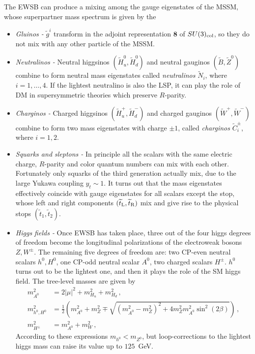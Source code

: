 \documentclass[12pt,a4paper]{book}
\newcommand{\bi}{\begin{itemize}}
\newcommand{\ei}{\end{itemize}}
\begin{document}
The EWSB can produce a mixing among the gauge eigenstates of the MSSM, whose superpartner mass spectrum is given by the
\bi
\item \textit{Gluinos -} $\tilde{g}^i$ transform in the adjoint representation $\mathbf{8}$ of $SU(3)_{\rm col}$, so they do not mix with any other particle of the MSSM.
\item \textit{Neutralinos -} Neutral higgsinos $\left(\widetilde{H}_u^0, \widetilde{H}_d^0\right)$ and neutral gauginos $\left(\widetilde{B}, \widetilde{Z}^0\right)$ combine to form neutral mass eigenstates called \textit{neutralinos} $\widetilde{N}_i$, where $i = 1, \dots, 4$. If the lightest neutralino is also the LSP, it can play the role of DM in supersymmetric theories which preserve $R$-parity.
\item \textit{Charginos -} Charged higgsinos $\left(\widetilde{H}_u^+, \widetilde{H}_d^-\right)$ and charged gauginos $\left(\widetilde{W}^+, \widetilde{W}^-\right)$ combine to form two mass eigenstates with charge $\pm 1$, called \textit{charginos} $\widetilde{C}^\pm_i$, where $i = 1, 2$.
\item \textit{Squarks and sleptons - } In principle all the scalars with the same electric charge, $R$-parity and color quantum numbers can mix with each other. Fortunately only squarks of the third generation actually mix, due to the large Yukawa coupling $y_t \sim 1$. It turns out that the mass eigenstates effectively coincide with gauge eigenstates for all scalars except the stop, whose left and right components $(\widetilde{t}_{\rm L}, \widetilde{t}_{\rm R})$ mix and give rise to the physical stops $(\widetilde{t}_1, \widetilde{t}_2)$.
\item \textit{Higgs fields -} Once EWSB has taken place, three out of the four higgs degrees of freedom become the longitudinal polarizations of the electroweak bosons $Z, W^\pm$. The remaining five degrees of freedom are: two CP-even neutral scalars $h^0, H^0$, one CP-odd neutral scalar $A^0$, two charged scalars $H^\pm$. $h^0$ turns out to be the lightest one, and then it plays the role of the SM higgs field. The tree-level masses are given by
\begin{align}
m^2_{A^0} &= 2 |\mu|^2 + m_{H_u}^2 + m_{H_d}^2 \,, \\
m_{h^0, H^0}^2 &= \frac{1}{2} \left(m_{A^0}^2 + m_Z^2 \mp \sqrt{\left(m_{A^0}^2 - m_Z^2\right)^2 + 4 m_Z^2 m_{A^0}^2 \sin^2 (2 \beta)}\right) \,,\\ 
m_{H^\pm}^2 &= m_{A^0}^2 + m_W^2 \,,
\end{align}
According to these expressions $m_{h^0} < m_{Z^0}$, but loop-corrections to the lightest higgs mass can raise its value up to $125 \,$ GeV.
\ei
\end{document}

